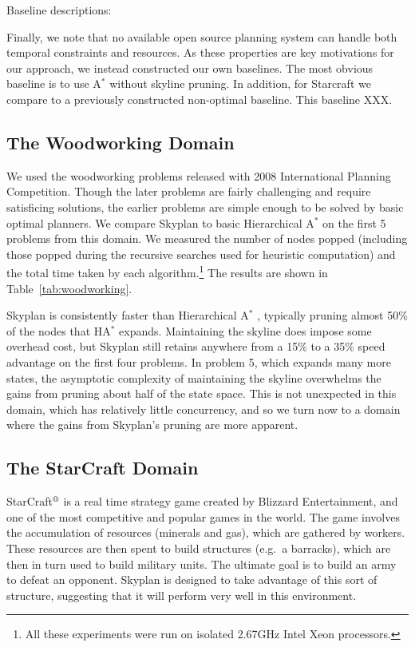 \documentclass[letterpaper]{article}
\theoremstyle{plain} \newtheorem{theorem}{Theorem} \newtheorem{proposition}{Proposition} \newtheorem{lemma}{Lemma}
\theoremstyle{definition} \newtheorem{definition}{Definition} \newtheorem{conjecture}{Conjecture} \newtheorem*{example}{Example}
\theoremstyle{remark} \newtheorem*{remark}{Remark} \newtheorem*{note}{Note} \newtheorem{case}{Case}
\newcommand{\Astar}{A$^*$ }
\begin{document}
Baseline descriptions:

Finally, we note that no available open source planning system can handle both temporal constraints and resources. As these properties are key motivations for our approach, we instead constructed our own baselines.
The most obvious baseline is to use \Astar without skyline pruning. In addition, for Starcraft we compare to a previously constructed non-optimal baseline. This baseline XXX.


\subsection{The Woodworking Domain}

We used the woodworking problems released with 2008
International Planning Competition.
Though the later problems are fairly challenging and require satisficing solutions,
the earlier problems are simple enough to be solved by basic optimal planners. We compare
Skyplan to basic Hierarchical \Astar on the first 5 problems from this domain. We measured
the number of nodes popped (including those popped during the recursive searches used
for heuristic computation) and the total time taken by each algorithm.\footnote{All
these experiments were run on isolated 2.67GHz Intel Xeon processors.} The results are
shown in Table~\ref{tab:woodworking}.

Skyplan is consistently faster than Hierarchical \Astar, typically pruning almost 50\% of the
nodes that H\Astar expands. Maintaining the skyline does impose some overhead cost, but Skyplan
still retains anywhere from a 15\% to a 35\% speed advantage on the first four problems. In problem 5, which expands many more states, the asymptotic complexity of maintaining the skyline overwhelms the gains from pruning about half of the state space. This is not unexpected in this domain, which has relatively little concurrency, and so we turn now to a domain where the gains from Skyplan's pruning are more apparent.

\subsection{The StarCraft Domain}

StarCraft$^\textrm{\textregistered}$ is a real time strategy game
created by Blizzard Entertainment, and one of the most competitive
and popular games in the world. The game involves the accumulation
of resources (minerals and gas), which are gathered by workers.
These resources are then spent to build structures (e.g.\ a barracks),
which are then in turn used to build military units. The ultimate goal is
to build an army to defeat an opponent. 
Skyplan is designed to take advantage of this sort of structure,
suggesting that it will perform very well in this environment.
\end{document}
